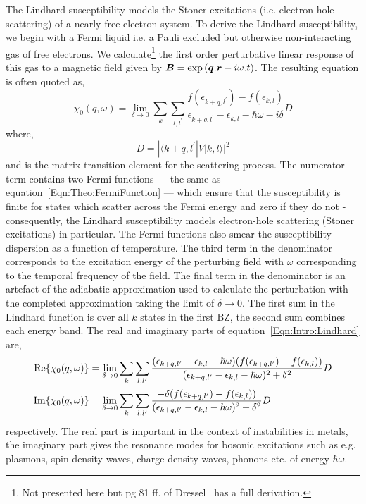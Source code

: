The Lindhard susceptibility models the Stoner excitations (i.e. electron-hole scattering) of a nearly free electron system. To derive the Lindhard susceptibility, we begin with a Fermi liquid i.e. a Pauli excluded but otherwise non-interacting gas of free electrons. We calculate\footnote{Not presented here but pg 81 ff. of Dressel~\cite{Dressel2002} has a full derivation.} the first order perturbative linear response of this gas to a magnetic field given by $\boldsymbol{B}=\exp{(\boldsymbol{q}.\boldsymbol{r} - i\omega.t})$. The resulting equation is often quoted as,
\begin{equation}
    \chi_0(q, \omega) = \lim_{\delta \to 0} \sum_{k}\sum_{l,l^\prime}\frac{f(\epsilon_{k+q,l^\prime}) - f(\epsilon_{k,l})}{\epsilon_{k+q,l^\prime} - \epsilon_{k,l} - \hbar\omega - i\delta}D
    \label{Eqn:Intro:Lindhard}
\end{equation}
where,
\begin{equation}
    D = |\langle k+q,l^\prime|V|k,l \rangle|^2
\end{equation}
and is the matrix transition element for the scattering process. The numerator term contains two Fermi functions --- the same as equation~\ref{Eqn:Theo:FermiFunction} --- which ensure that the susceptibility is finite for states which scatter across the Fermi energy and zero if they do not - consequently, the Lindhard susceptibility models electron-hole scattering (Stoner excitations) in particular. The Fermi functions also smear the susceptibility dispersion as a function of temperature. The third term in the denominator corresponds to the excitation energy of the perturbing field with $\omega$ corresponding to the temporal frequency of the field. The final term in the denominator is an artefact of the adiabatic approximation used to calculate the perturbation with the completed approximation taking the limit of $\delta \to 0$. The first sum in the Lindhard function is over all $k$ states in the first \ac{BZ}, the second sum combines each energy band. The real and imaginary parts of equation~\ref{Eqn:Intro:Lindhard} are,
\begin{align}
\operatorname{Re}\{\chi_0(q, \omega)\} &= \lim_{\delta \to 0} \sum_{k}\sum_{l, l^\prime}\frac{(\epsilon_{k+q,l^\prime} - \epsilon_{k,l} - \hbar\omega) (f(\epsilon_{k+q,l^\prime}) - f(\epsilon_{k,l}))}{(\epsilon_{k+q,l^\prime} - \epsilon_{k,l} - \hbar\omega)^2 + \delta^2}D \\
\label{Eqn:Theo:ReLindhard}
\operatorname{Im}\{\chi_0(q, \omega)\} &= \lim_{\delta \to 0} \sum_{k}\sum_{l, l^\prime}\frac{-\delta (f(\epsilon_{k+q,l^\prime}) - f(\epsilon_{k,l}))}{(\epsilon_{k+q,l^\prime} - \epsilon_{k,l} - \hbar\omega)^2 + \delta^2}D\\
\label{Eqn:Theo:ImLindhard}
\end{align}
respectively. The real part is important in the context of instabilities in metals, the imaginary part gives the resonance modes for bosonic excitations such as e.g. plasmons, spin density waves, charge density waves, phonons etc. of energy $\hbar\omega$.

